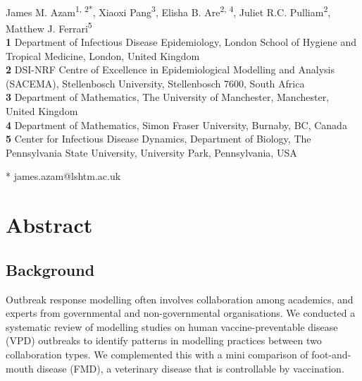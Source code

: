 \documentclass[10pt,letterpaper]{article}
\begin{document}
\vspace*{0.2in}

\begin{flushleft}
{\Large
\textbf{}
}
\newline
\\
James M. Azam\textsuperscript{1, 2*},
Xiaoxi Pang\textsuperscript{3},
Elisha B. Are\textsuperscript{2, 4},
Juliet R.C. Pulliam\textsuperscript{2},
Matthew J. Ferrari\textsuperscript{5}
\\
\bigskip
\textbf{1} Department of Infectious Disease Epidemiology, London School of Hygiene and Tropical Medicine, London, United Kingdom
\\
\textbf{2} DSI-NRF Centre of Excellence in Epidemiological Modelling and Analysis (SACEMA), Stellenbosch University, Stellenbosch 7600, South Africa
\\
\textbf{3} Department of Mathematics, The University of Manchester, Manchester, United Kingdom
\\
\textbf{4} Department of Mathematics, Simon Fraser University, Burnaby, BC, Canada
\\
\textbf{5} Center for Infectious Disease Dynamics, Department of Biology, The Pennsylvania
State University, University Park, Pennsylvania, USA
\\
\bigskip

* james.azam@lshtm.ac.uk

\end{flushleft}
\section*{Abstract}
\subsection*{Background}
Outbreak response modelling often involves collaboration among academics, and experts from governmental and non-governmental organisations. We conducted a systematic review of modelling studies on human vaccine-preventable disease (VPD) outbreaks to identify patterns in modelling practices between two collaboration types. We complemented this with a mini comparison of foot-and-mouth disease (FMD), a veterinary disease that is controllable by vaccination.   
\end{document}
